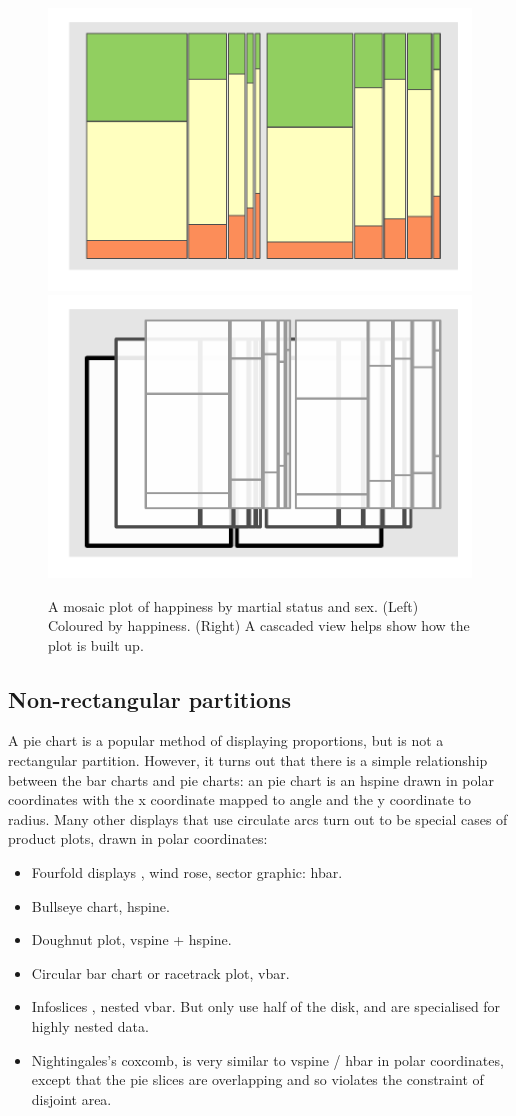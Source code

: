 \documentclass[letterpaper,oneside]{scrartcl}
\begin{document}
\begin{figure}[htbp]
  \centering
    \includegraphics[width=0.5\linewidth]{sex-marital-happy}%
    \includegraphics[width=0.5\linewidth]{cascade}
  \caption{A mosaic plot of happiness by martial status and sex. (Left) Coloured by happiness.  (Right) A cascaded view helps show how the plot is built up.}
  \label{fig:cascade}
\end{figure}

\subsection{Non-rectangular partitions}

A pie chart is a popular method of displaying proportions, but is not a rectangular partition. However, it turns out that there is a simple relationship between the bar charts and pie charts: an pie chart is an hspine drawn in polar coordinates with the x coordinate mapped to angle and the y coordinate to radius. Many other displays that use circulate arcs turn out to be special cases of product plots, drawn in polar coordinates:   

\begin{itemize}
  \item Fourfold displays \citep{friendly:1995}, wind rose, sector graphic: hbar.

  \item Bullseye chart, hspine.

  \item Doughnut plot, vspine + hspine.

  \item Circular bar chart or racetrack plot, vbar.

  \item Infoslices \citep{andrews:1998}, nested vbar.  But only use half of the disk, and are specialised for highly nested data.

  \item Nightingales's coxcomb, is very similar to vspine / hbar in polar coordinates, except that the pie slices are overlapping and so violates the constraint of disjoint area.
\end{itemize}
\end{document}
